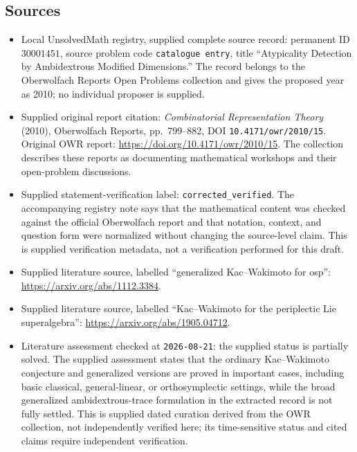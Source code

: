 \documentclass[11pt]{article}
\begin{document}
\subsection{Sources}
\begin{itemize}
\item Local UnsolvedMath registry, supplied complete source record: permanent ID \(30001451\), source problem code \texttt{catalogue entry}, title ``Atypicality Detection by Ambidextrous Modified Dimensions.'' The record belongs to the Oberwolfach Reports Open Problems collection and gives the proposed year as 2010; no individual proposer is supplied.
\item Supplied original report citation: \emph{Combinatorial Representation Theory} (2010), Oberwolfach Reports, pp.~799--882, DOI \texttt{10.4171/owr/2010/15}. Original OWR report: \url{https://doi.org/10.4171/owr/2010/15}. The collection describes these reports as documenting mathematical workshops and their open-problem discussions.
\item Supplied statement-verification label: \texttt{corrected\_verified}. The accompanying registry note says that the mathematical content was checked against the official Oberwolfach report and that notation, context, and question form were normalized without changing the source-level claim. This is supplied verification metadata, not a verification performed for this draft.
\item Supplied literature source, labelled ``generalized Kac--Wakimoto for osp'': \url{https://arxiv.org/abs/1112.3384}.
\item Supplied literature source, labelled ``Kac--Wakimoto for the periplectic Lie superalgebra'': \url{https://arxiv.org/abs/1905.04712}.
\item Literature assessment checked at \texttt{2026-08-21}: the supplied status is partially solved. The supplied assessment states that the ordinary Kac--Wakimoto conjecture and generalized versions are proved in important cases, including basic classical, general-linear, or orthosymplectic settings, while the broad generalized ambidextrous-trace formulation in the extracted record is not fully settled. This is supplied dated curation derived from the OWR collection, not independently verified here; its time-sensitive status and cited claims require independent verification.
\end{itemize}
\end{document}
